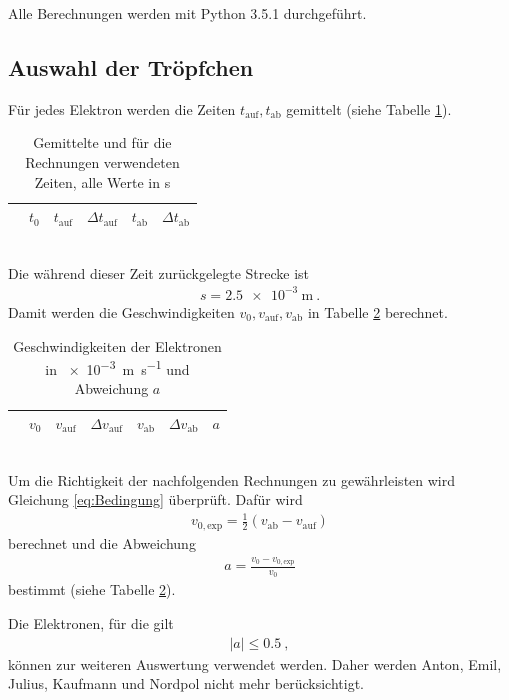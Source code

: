 Alle Berechnungen werden mit Python 3.5.1 durchgeführt.
\subsection{Auswahl der Tröpfchen\label{sec:Auswahl}}
Für jedes Elektron werden die Zeiten $t_\text{auf},t_\text{ab}$ gemittelt (siehe Tabelle \ref{fig:Zeiten}).
\begin{table}[h!]
	\centering
	\begin{tabular}{cccccc}
		& $t_0$ & $t_\text{auf}$ & $\Delta t_\text{auf}$ & $t_\text{ab}$ & $\Delta t_\text{ab}$ \\
		\hline
		
	\end{tabular}
	\caption{Gemittelte und für die Rechnungen verwendeten Zeiten, alle Werte in \si{\second}}
	\label{fig:Zeiten}
\end{table} \\
Die während dieser Zeit zurückgelegte Strecke ist
\begin{align}
	s = \SI{2.5e-3}{\meter} \ .
\end{align}
Damit werden die Geschwindigkeiten $v_0,v_\text{auf},v_\text{ab}$ in Tabelle \ref{fig:Vel} berechnet. \\
\begin{table}[h!]
	\centering
	\begin{tabular}{cccccc|c}
		& $v_0$ & $v_\text{auf}$ & $\Delta v_\text{auf}$ & $v_\text{ab}$ & $\Delta v_\text{ab}$ & $a$ \\
		\hline
		
	\end{tabular}
	\caption{Geschwindigkeiten der Elektronen in \SI{e-3}{\meter\per\second} und Abweichung $a$}
	\label{fig:Vel}
\end{table} \\
Um die Richtigkeit der nachfolgenden Rechnungen zu gewährleisten wird Gleichung \eqref{eq:Bedingung} überprüft. Dafür wird
\begin{align}
	v_{0,\text{exp}} = \frac{1}{2}(v_\text{ab}-v_\text{auf})
\end{align}
berechnet und die Abweichung
\begin{align}
	a = \frac{v_0-v_{0,\text{exp}}}{v_0}
\end{align}
bestimmt (siehe Tabelle \ref{fig:Vel}).

Die Elektronen, für die gilt
\begin{align}
	|a|\leq 0.5 \ ,
\end{align}
können zur weiteren Auswertung verwendet werden. Daher werden Anton, Emil, Julius, Kaufmann und Nordpol nicht mehr berücksichtigt.
\clearpage


